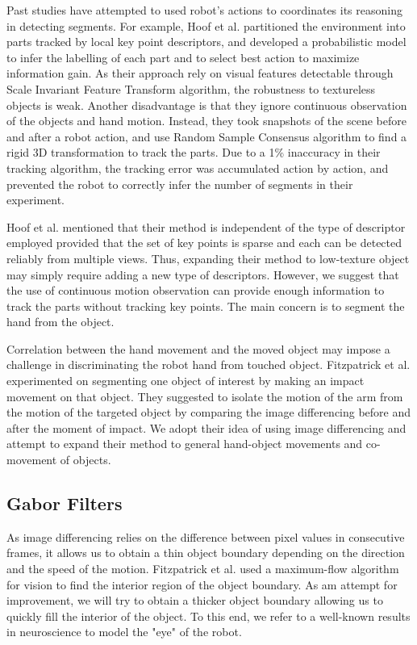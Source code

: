 \documentclass{article}
\begin{document}
Past studies have attempted to used robot's actions to coordinates its reasoning in detecting segments. For example, Hoof et al. \cite{herke} partitioned the environment into parts tracked by local key point descriptors, and developed a probabilistic model to infer the labelling of each part and to select best action to maximize information gain. As their approach rely on visual features detectable through Scale Invariant Feature Transform algorithm, the robustness to textureless objects is weak. Another disadvantage is that they ignore continuous observation of the objects and hand motion. Instead, they took snapshots of the scene before and after a robot action, and use Random Sample Consensus algorithm to find a rigid 3D transformation to track the parts. Due to a 1\% inaccuracy in their tracking algorithm, the tracking error was accumulated action by action, and prevented the robot to correctly infer the number of segments in their experiment. 

Hoof et al. mentioned that their method is independent of the type of descriptor employed provided that the set of key points is sparse and each can be detected reliably from multiple views. Thus, expanding their method to low-texture object may simply require adding a new type of descriptors. However, we suggest that the use of continuous motion observation can provide enough information to track the parts without tracking key points. The main concern is to segment the hand from the object.

Correlation between the hand movement and the moved object may impose a challenge in discriminating the robot hand from touched object. Fitzpatrick et al. \cite{max-flow} experimented on segmenting one object of interest by making an impact movement on that object. They suggested to isolate the motion of the arm from the motion of the targeted object by comparing the image differencing before and after the moment of impact. We adopt their idea of using image differencing and attempt to expand their method to general hand-object movements and co-movement of objects.

\subsection{Gabor Filters}

As image differencing relies on the difference between pixel values in consecutive frames, it allows us to obtain a thin object boundary depending on the direction and the speed of the motion. Fitzpatrick et al. \cite{max-flow} used a maximum-flow algorithm for vision \cite{kolmo} to find the interior region of the object boundary. As am attempt for improvement, we will try to obtain a thicker object boundary allowing us to quickly fill the interior of the object. To this end, we refer to a well-known results in neuroscience to model the "eye" of the robot. 
\end{document}
